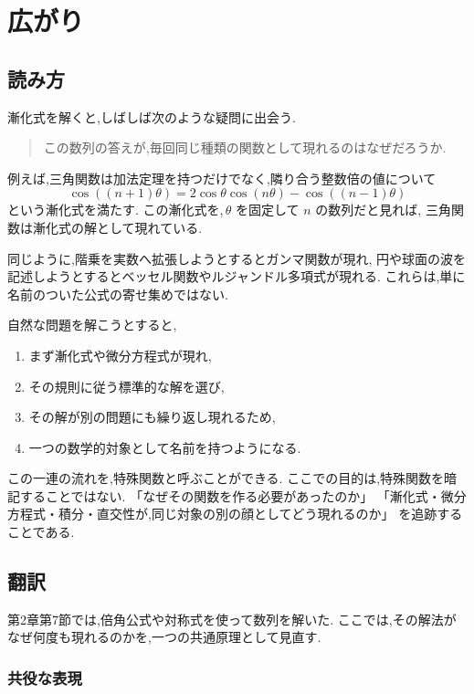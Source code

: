 
\section{広がり}


\subsection*{読み方}

漸化式を解くと,しばしば次のような疑問に出会う.

\begin{quote}
  この数列の答えが,毎回同じ種類の関数として現れるのはなぜだろうか.
\end{quote}

例えば,三角関数は加法定理を持つだけでなく,隣り合う整数倍の値について
\[
  \cos((n+1)\theta)
  =2\cos\theta\cos(n\theta)-\cos((n-1)\theta)
\]
という漸化式を満たす.
この漸化式を,\,$\theta$ を固定して $n$ の数列だと見れば,
三角関数は漸化式の解として現れている.

同じように,階乗を実数へ拡張しようとするとガンマ関数が現れ,
円や球面の波を記述しようとするとベッセル関数やルジャンドル多項式が現れる.
これらは,単に名前のついた公式の寄せ集めではない.

自然な問題を解こうとすると,
\begin{enumerate}
  \item まず漸化式や微分方程式が現れ,
  \item その規則に従う標準的な解を選び,
  \item その解が別の問題にも繰り返し現れるため,
  \item 一つの数学的対象として名前を持つようになる.
\end{enumerate}

この一連の流れを,特殊関数と呼ぶことができる.
ここでの目的は,特殊関数を暗記することではない.
「なぜその関数を作る必要があったのか」
「漸化式・微分方程式・積分・直交性が,同じ対象の別の顔としてどう現れるのか」
を追跡することである.

\subsection{翻訳}

第2章第7節では,倍角公式や対称式を使って数列を解いた.
ここでは,その解法がなぜ何度も現れるのかを,一つの共通原理として見直す.

\subsubsection{共役な表現}

